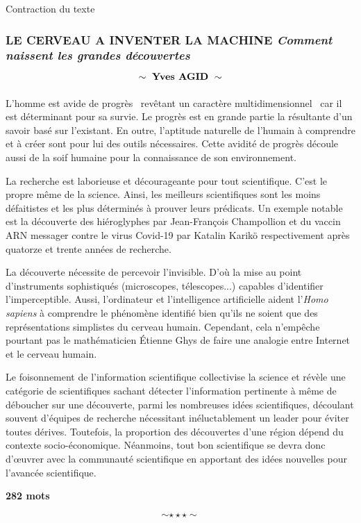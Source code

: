 \newpage \begin{bclogo}[barre=none,logo={}]{Contraction du texte} 
	\begin{center}
		\subsubsection*{LE CERVEAU A INVENTER LA MACHINE \emph{Comment naissent les grandes découvertes} $$\sim\ \text{{\bfseries Yves AGID}}\ \sim$$ }
	\end{center}
\end{bclogo}
	
	\hspace*{0.5cm}L'homme est avide de progrès \textendash\ revêtant un caractère multidimensionnel \textendash\ car il est déterminant pour sa survie. Le progrès est en grande partie la résultante d'un savoir basé sur l'existant. En outre, l'aptitude naturelle de l'humain à comprendre et à créer sont pour lui des outils nécessaires. Cette avidité de progrès découle aussi de la soif humaine pour la connaissance de son environnement. \newline
	
	\hspace*{0.5cm}La recherche est laborieuse et décourageante pour tout scientifique. C'est le propre même de la science. Ainsi, les meilleurs scientifiques sont les moins défaitistes et les plus déterminés à prouver leurs prédicats. Un exemple notable est la découverte des hiéroglyphes par Jean-François Champollion et du vaccin ARN messager contre le virus Covid-19 par Katalin Karikö respectivement après quatorze et trente années de recherche.\newline
	
	\hspace*{0.5cm}La découverte nécessite de percevoir l'invisible. D'où la mise au point d'instruments sophistiqués (microscopes, télescopes...) capables d'identifier l'imperceptible. Aussi, l'ordinateur et l’intelligence artificielle aident l'\emph{Homo sapiens} à comprendre le phénomène identifié bien qu'ils ne soient que des représentations simplistes du cerveau humain. Cependant, cela n'empêche pourtant pas le mathématicien Étienne Ghys de faire une analogie entre Internet et le cerveau humain.\newline
	
	\hspace*{0.5cm}Le foisonnement de l'information scientifique collectivise la science et révèle une catégorie de scientifiques sachant détecter l'information pertinente à même de déboucher sur une découverte, parmi les nombreuses idées scientifiques, découlant souvent d'équipes de recherche nécessitant inéluctablement un leader pour éviter toutes dérives. Toutefois, la proportion des découvertes d'une région dépend du contexte socio-économique. Néanmoins, tout bon scientifique se devra donc d'\oe uvrer avec la communauté scientifique en apportant des idées nouvelles pour l'avancée scientifique.
	
\begin{center}
	\textbf{282 mots}
\end{center}$$\sim\star\star\star\sim$$

